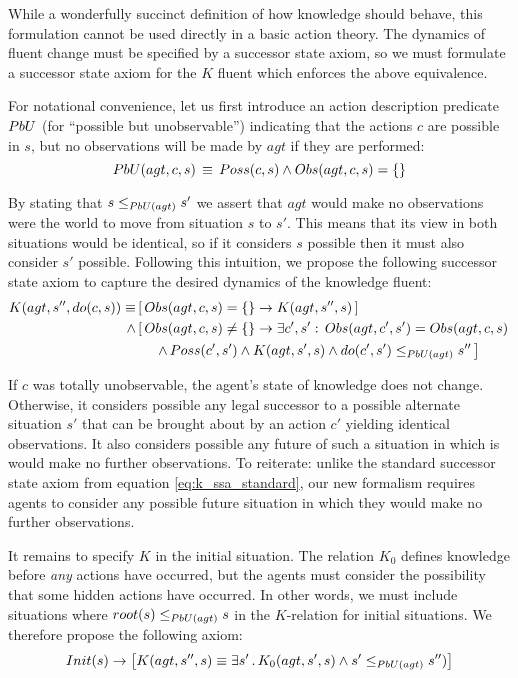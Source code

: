 While a wonderfully succinct definition of how knowledge should behave,
this formulation cannot be used directly in a basic action theory.
The dynamics of fluent change must be specified by a successor state
axiom, so we must formulate a successor state axiom for the $K$ fluent
which enforces the above equivalence.

For notational convenience, let us first introduce an action description
predicate $PbU$ (for {}``possible but unobservable'') indicating
that the actions $c$ are possible in $s$, but no observations will
be made by $agt$ if they are performed:\begin{equation}
PbU(agt,c,s)\,\equiv\, Poss(c,s)\wedge Obs(agt,c,s)=\{\}\label{eqn:PbU_defn}\end{equation}


By stating that $s\leq_{PbU(agt)}s'$ we assert that $agt$ would
make no observations were the world to move from situation $s$ to
$s'$. This means that its view in both situations would be identical,
so if it considers $s$ possible then it must also consider $s'$
possible. Following this intuition, we propose the following successor
state axiom to capture the desired dynamics of the knowledge fluent:\begin{align}
K(agt,s'',do(c,s))\equiv & \left[\, Obs(agt,c,s)=\{\}\rightarrow K(agt,s'',s)\,\right]\nonumber \\
\wedge & \left[\, Obs(agt,c,s)\neq\{\}\rightarrow\exists c',s':\, Obs(agt,c',s')=Obs(agt,c,s)\right.\nonumber \\
 & \left.\,\,\,\,\,\,\,\,\wedge\, Poss(c',s')\wedge K(agt,s',s)\wedge do(c',s')\leq_{PbU(agt)}s''\,\right]\label{eqn:new_k_ssa}\end{align}
 

If $c$ was totally unobservable, the agent's state of knowledge does
not change. Otherwise, it considers possible any legal successor to
a possible alternate situation $s'$ that can be brought about by
an action $c'$ yielding identical observations. It also considers
possible any future of such a situation in which is would make no
further observations. To reiterate: unlike the standard successor
state axiom from equation \eqref{eq:k_ssa_standard}, our new formalism
requires agents to consider any possible future situation in which
they would make no further observations.

It remains to specify $K$ in the initial situation. The relation
$K_{0}$ defines knowledge before \emph{any} actions have occurred,
but the agents must consider the possibility that some hidden actions
have occurred. In other words, we must include situations where $root(s)\leq_{PbU(agt)}s$
in the $K$-relation for initial situations. We therefore propose
the following axiom:\begin{gather}
Init(s)\rightarrow\left[K(agt,s'',s)\equiv\exists s'\,.\, K_{0}(agt,s',s)\wedge s'\leq_{PbU(agt)}s'')\right]\label{eqn:new_k_s0}\end{gather}


